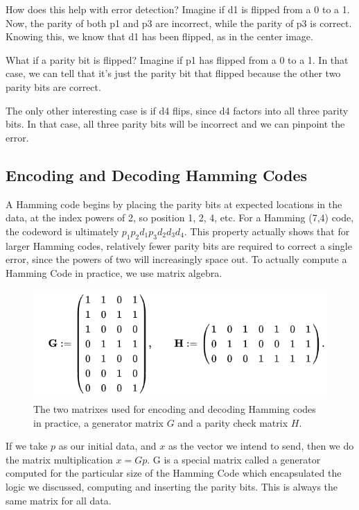 \documentclass[12pt]{article}
\begin{document}
How does this help with error detection? Imagine if d1 is flipped from a 0 to a 1. Now, the parity of both p1 and p3 are incorrect, while the parity of p3 is correct. Knowing this, we know that d1 has been flipped, as in the center image.

What if a parity bit is flipped? Imagine if p1 has flipped from a 0 to a 1. In that case, we can tell that it's just the parity bit that flipped because the other two parity bits are correct.

The only other interesting case is if d4 flips, since d4 factors into all three parity bits. In that case, all three parity bits will be incorrect and we can pinpoint the error. \cite{wolf}

\subsection{Encoding and Decoding Hamming Codes}

A Hamming code begins by placing the parity bits at expected locations in the data, at the index powers of 2, so position 1, 2, 4, etc. For a Hamming (7,4) code, the codeword is ultimately $p_1p_2d_1p_3d_2d_3d_4$. This property actually shows that for larger Hamming codes, relatively fewer parity bits are required to correct a single error, since the powers of two will increasingly space out. To actually compute a Hamming Code in practice, we use matrix algebra. 

\begin{figure}[h!]
 \centering
 \includegraphics[width=.5\textwidth]{img/matrix.png}
 \caption{The two matrixes used for encoding and decoding Hamming codes in practice, a generator matrix $G$ and a parity check matrix $H$. \cite{wiki}}
 \label{fig:matrix}	
 \end{figure}

If we take $p$ as our initial data, and $x$ as the vector we intend to send, then we do the matrix multiplication $x = Gp$. G is a special matrix called a generator computed for the particular size of the Hamming Code which encapsulated the logic we discussed, computing and inserting the parity bits. This is always the same matrix for all data.
\end{document}
